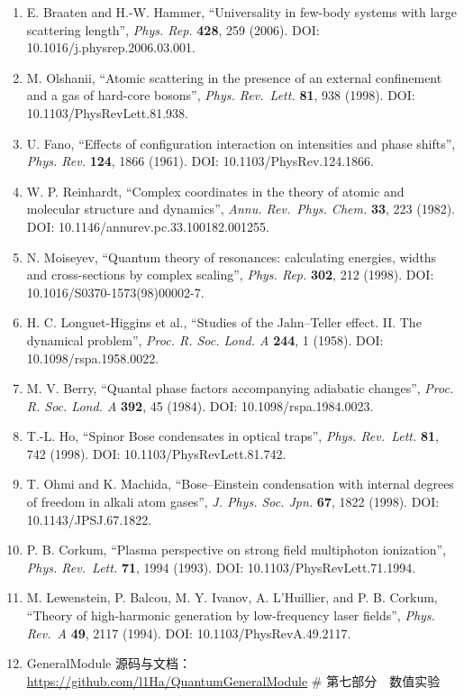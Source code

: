 \documentclass[
]{ctexbook}
\providecommand{\tightlist}{%
  \setlength{\itemsep}{0pt}\setlength{\parskip}{0pt}}
\begin{document}
\begin{enumerate}
\def\labelenumi{\arabic{enumi}.}
\tightlist
\item
  E. Braaten and H.-W. Hammer, ``Universality in few-body systems with
  large scattering length'', \emph{Phys. Rep.} \textbf{428}, 259 (2006).
  DOI: 10.1016/j.physrep.2006.03.001.
\item
  M. Olshanii, ``Atomic scattering in the presence of an external
  confinement and a gas of hard-core bosons'', \emph{Phys. Rev.~Lett.}
  \textbf{81}, 938 (1998). DOI: 10.1103/PhysRevLett.81.938.
\item
  U. Fano, ``Effects of configuration interaction on intensities and
  phase shifts'', \emph{Phys. Rev.} \textbf{124}, 1866 (1961). DOI:
  10.1103/PhysRev.124.1866.
\item
  W. P. Reinhardt, ``Complex coordinates in the theory of atomic and
  molecular structure and dynamics'', \emph{Annu. Rev.~Phys. Chem.}
  \textbf{33}, 223 (1982). DOI: 10.1146/annurev.pc.33.100182.001255.
\item
  N. Moiseyev, ``Quantum theory of resonances: calculating energies,
  widths and cross-sections by complex scaling'', \emph{Phys. Rep.}
  \textbf{302}, 212 (1998). DOI: 10.1016/S0370-1573(98)00002-7.
\item
  H. C. Longuet-Higgins et al., ``Studies of the Jahn--Teller effect.
  II. The dynamical problem'', \emph{Proc. R. Soc. Lond. A}
  \textbf{244}, 1 (1958). DOI: 10.1098/rspa.1958.0022.
\item
  M. V. Berry, ``Quantal phase factors accompanying adiabatic changes'',
  \emph{Proc. R. Soc. Lond. A} \textbf{392}, 45 (1984). DOI:
  10.1098/rspa.1984.0023.
\item
  T.-L. Ho, ``Spinor Bose condensates in optical traps'', \emph{Phys.
  Rev.~Lett.} \textbf{81}, 742 (1998). DOI: 10.1103/PhysRevLett.81.742.
\item
  T. Ohmi and K. Machida, ``Bose--Einstein condensation with internal
  degrees of freedom in alkali atom gases'', \emph{J. Phys. Soc. Jpn.}
  \textbf{67}, 1822 (1998). DOI: 10.1143/JPSJ.67.1822.
\item
  P. B. Corkum, ``Plasma perspective on strong field multiphoton
  ionization'', \emph{Phys. Rev.~Lett.} \textbf{71}, 1994 (1993). DOI:
  10.1103/PhysRevLett.71.1994.
\item
  M. Lewenstein, P. Balcou, M. Y. Ivanov, A. L'Huillier, and P. B.
  Corkum, ``Theory of high-harmonic generation by low-frequency laser
  fields'', \emph{Phys. Rev.~A} \textbf{49}, 2117 (1994). DOI:
  10.1103/PhysRevA.49.2117.
\item
  GeneralModule
  源码与文档：\url{https://github.com/l1Ha/QuantumGeneralModule} \#
  第七部分　数值实验
\end{enumerate}
\end{document}
